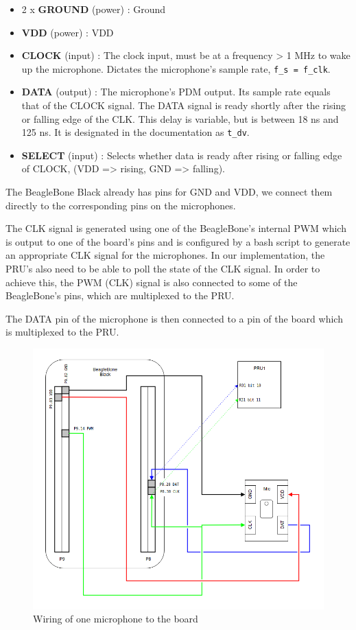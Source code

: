 \documentclass[]{report}
\providecommand{\tightlist}{%
	\setlength{\itemsep}{0pt}\setlength{\parskip}{0pt}}
\begin{document}
\begin{itemize}
\tightlist
\item
  2 x \textbf{GROUND} (power) : Ground
\item
  \textbf{VDD} (power) : VDD
\item
  \textbf{CLOCK} (input) : The clock input, must be at a frequency
  \textgreater{} 1 MHz to wake up the microphone. Dictates the
  microphone's sample rate, \texttt{f\_s\ =\ f\_clk}.
\item
  \textbf{DATA} (output) : The microphone's PDM output. Its sample rate
  equals that of the CLOCK signal. The DATA signal is ready shortly
  after the rising or falling edge of the CLK. This delay is variable,
  but is between 18 ns and 125 ns. It is designated in the documentation
  as \texttt{t\_dv}.
\item
  \textbf{SELECT} (input) : Selects whether data is ready after rising
  or falling edge of CLOCK, (VDD =\textgreater{} rising, GND
  =\textgreater{} falling).
\end{itemize}

The BeagleBone Black already has pins for GND and VDD, we connect them
directly to the corresponding pins on the microphones.

The CLK signal is generated using one of the BeagleBone's internal PWM
which is output to one of the board's pins and is configured by a bash
script to generate an appropriate CLK signal for the microphones. In our
implementation, the PRU's also need to be able to poll the state of the
CLK signal. In order to achieve this, the PWM (CLK) signal is also
connected to some of the BeagleBone's pins, which are multiplexed to the
PRU.

The DATA pin of the microphone is then connected to a pin of the board
which is multiplexed to the PRU.

\begin{figure}[h]
\centering
\includegraphics[width=0.6\linewidth]{Pictures/wiring.png}
\caption{Wiring of one microphone to the board}
\end{figure}
\end{document}
